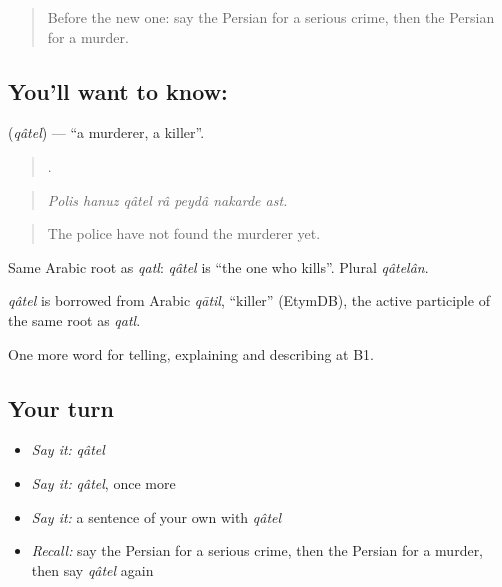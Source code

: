 \label{lesson:FA-C318-qatel}



\begin{quote}
Before the new one: say the Persian for a serious crime, then the Persian for a murder.
\end{quote}

\subsection*{You'll want to know: }
\textbf{} (\emph{qâtel}) — \textquotedblleft{}a murderer, a killer\textquotedblright{}.

\begin{quote}
      .
\end{quote}

\begin{quote}
\emph{Polis hanuz qâtel râ peydâ nakarde ast.}
\end{quote}

\begin{quote}
The police have not found the murderer yet.
\end{quote}

Same Arabic root as \emph{qatl}: \emph{qâtel} is \textquotedblleft{}the one who kills\textquotedblright{}. Plural \emph{qâtelân}.

\begin{cousinweb}
\emph{qâtel} is borrowed from Arabic \emph{qātil}, \textquotedblleft{}killer\textquotedblright{} (EtymDB), the active participle of the same root as \emph{qatl}.
\end{cousinweb}

\begin{grammarlens}[title={What you've built}]
One more word for telling, explaining and describing at B1.
\end{grammarlens}

\subsection*{Your turn}
\begin{itemize}
\raggedright
  \item \emph{Say it:} \emph{qâtel}
  \item \emph{Say it:} \emph{qâtel}, once more
  \item \emph{Say it:} a sentence of your own with \emph{qâtel}
  \item \emph{Recall:} say the Persian for a serious crime, then the Persian for a murder, then say \emph{qâtel} again
\end{itemize}

